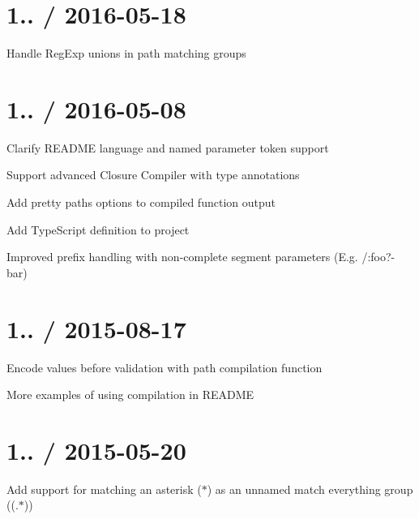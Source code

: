 \section*{1.. / 2016-\/05-\/18 }


\begin{DoxyItemize}
\item Handle Reg\+Exp unions in path matching groups
\end{DoxyItemize}

\section*{1.. / 2016-\/05-\/08 }


\begin{DoxyItemize}
\item Clarify R\+E\+A\+D\+ME language and named parameter token support
\item Support advanced Closure Compiler with type annotations
\item Add pretty paths options to compiled function output
\item Add Type\+Script definition to project
\item Improved prefix handling with non-\/complete segment parameters (E.\+g. {\ttfamily /\+:foo?-\/bar})
\end{DoxyItemize}

\section*{1.. / 2015-\/08-\/17 }


\begin{DoxyItemize}
\item Encode values before validation with path compilation function
\item More examples of using compilation in R\+E\+A\+D\+ME
\end{DoxyItemize}

\section*{1.. / 2015-\/05-\/20 }


\begin{DoxyItemize}
\item Add support for matching an asterisk ({\ttfamily $\ast$}) as an unnamed match everything group ({\ttfamily (.$\ast$)})
\end{DoxyItemize}


